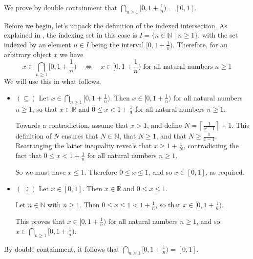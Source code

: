 \begin{example}
\label{exIndexedIntersectionOfHalfOpenIntervals}
We prove by double containment that $\displaystyle \bigcap_{n \ge 1} [0,1+\textstyle\frac{1}{n}) = [0,1]$.

Before we begin, let's unpack the definition of the indexed intersection. As explained in , the indexing set in this case is $I = \{ n \in \mathbb{N} \mid n \ge 1 \}$, with the set indexed by an element $n \in I$ being the interval $[0,1+\frac{1}{n})$. Therefore, for an arbitrary object $x$ we have
\[ x \in \bigcap_{n \ge 1} [0,1+\textstyle\frac{1}{n}) \quad \Leftrightarrow \quad x \in [0,1+\frac{1}{n}) \text{ for all natural numbers } n \ge 1 \]
We will use this in what follows.

\begin{itemize}
\item $(\subseteq)$ Let $x \in \displaystyle \bigcap_{n \ge 1} [0,1+\textstyle\frac{1}{n})$. Then $x \in [0,1+\frac{1}{n})$ for all natural numbers $n \ge 1$, so that $x \in \mathbb{R}$ and $0 \le x < 1+\frac{1}{n}$ for all natural numbers $n \ge 1$.

Towards a contradiction, assume that $x>1$, and define $N = \left\lceil \frac{1}{x-1} \right\rceil + 1$. This definition of $N$ ensures that $N \in \mathbb{N}$, that $N \ge 1$, and that $N \ge \frac{1}{x-1}$. Rearranging the latter inequality reveals that $x \ge 1+\frac{1}{N}$, contradicting the fact that $0 \le x < 1+\frac{1}{n}$ for all natural numbers $n \ge 1$.

So we must have $x \le 1$. Therefore $0 \le x \le 1$, and so $x \in [0,1]$, as required.
\item $(\supseteq)$ Let $x \in [0,1]$. Then $x \in \mathbb{R}$ and $0 \le x \le 1$.

Let $n \in \mathbb{N}$ with $n \ge 1$. Then $0 \le x \le 1 < 1+\frac{1}{n}$, so that $x \in [0,1+\frac{1}{n})$.

This proves that $x \in [0,1+\frac{1}{n})$ for all natural numbers $n \ge 1$, and so $x \in \bigcap_{n \ge 1} [0,1+\textstyle\frac{1}{n})$.
\end{itemize}

By double containment, it follows that $\displaystyle\bigcap_{n \ge 1} [0,1+\frac{1}{n}) = [0,1]$.
\end{example}



